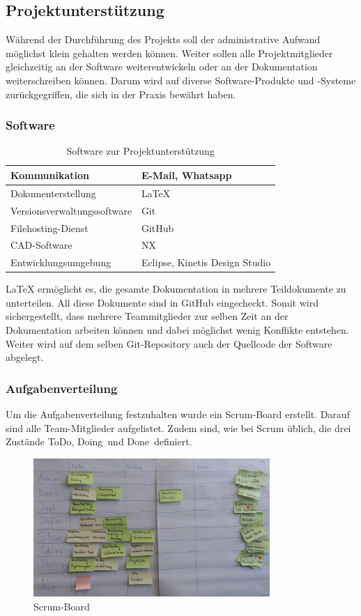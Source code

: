 \subsection{Projektunterstützung}
Während der Durchführung des Projekts soll der administrative Aufwand möglichst klein gehalten werden können. Weiter sollen alle Projektmitglieder gleichzeitig an der Software weiterentwickeln oder an der Dokumentation weiterschreiben können. Darum wird auf diverse Software-Produkte und -Systeme zurückgegriffen, die sich in der Praxis bewährt haben.
%
\subsubsection{Software}
\begin{table}[H]
\begin{tabular}{|p{}|p{}|}\hline
%	
Kommunikation	&	E-Mail, Whatsapp \\\hline
Dokumenterstellung & LaTeX\\\hline
Versionsverwaltungssoftware & Git \\\hline
Filehosting-Dienst & GitHub \\\hline
CAD-Software & NX\\\hline
Entwicklungsumgebung	& Eclipse, Kinetis Design Studio \\\hline
%
\end{tabular}
\caption{Software zur Projektunterstützung}
\end{table}
LaTeX ermöglicht es, die gesamte Dokumentation in mehrere Teildokumente zu unterteilen. All diese Dokumente sind in GitHub eingecheckt. Somit wird sichergestellt, dass mehrere Teammitglieder zur selben Zeit an der Dokumentation arbeiten können und dabei möglichst wenig Konflikte entstehen. Weiter wird auf dem selben Git-Repository auch der Quellcode der Software abgelegt. \\
\subsubsection{Aufgabenverteilung}
Um die Aufgabenverteilung festzuhalten wurde ein Scrum-Board erstellt. Darauf sind alle Team-Mitglieder aufgelistet. Zudem sind, wie bei Scrum üblich, die drei Zustände \glqq ToDo\grqq, \glqq Doing\grqq \ und \glqq Done\grqq \ definiert.
\begin{figure}[H]%
\centering
\includegraphics[width=0.8\textwidth]{04_Projektmanagement/fig/scrumBoard.jpg}
\caption{Scrum-Board}
\label{fig:scrumBoard}
\end{figure}